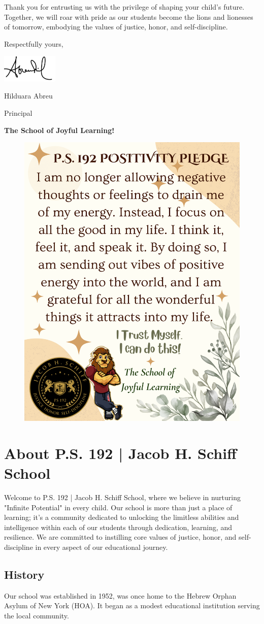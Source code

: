 \documentclass[11pt, letterpaper]{article}
\begin{document}
Thank you for entrusting us with the privilege of shaping your child's future. Together, we will roar with pride as our students become the lions and lionesses of tomorrow, embodying the values of justice, honor, and self-discipline.

Respectfully yours,

\includegraphics[width=0.2\textwidth]{hil_signature}

Hilduara Abreu

Principal

\textbf{The School of Joyful Learning!}
\pagebreak
\begin{figure}
\centering
\includegraphics[width=.45\textwidth]{positivity.pdf}
\end{figure}
\section{About P.S. 192 | Jacob H. Schiff School}
Welcome to P.S. 192 | Jacob H. Schiff School, where we believe in nurturing "Infinite Potential" in every child. Our school is more than just a place of learning; it's a community dedicated to unlocking the limitless abilities and intelligence within each of our students through dedication, learning, and resilience. We are committed to instilling core values of justice, honor, and self-discipline in every aspect of our educational journey.

\subsection{History}
Our school was established in 1952, was once home to the Hebrew Orphan Asylum of New York (HOA). It began as a modest educational institution serving the local community.
\end{document}
